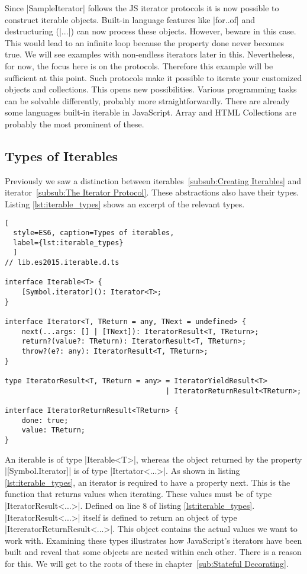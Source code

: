 Since |SampleIterator| follows the JS iterator protocols it is now possible to 
construct iterable objects. Built-in language features like |for..of| and 
destructuring (|...|) can now process these objects. However, beware in this 
case. This would lead to an infinite loop because the property done never 
becomes true. We will see examples with non-endless iterators later in this. 
Nevertheless, for now, the focus here is on the protocols. Therefore this 
example will be sufficient at this point.
\newline
Such protocols make it possible to iterate your customized objects and
collections. This opens new possibilities. Various programming tasks can be 
solvable differently, probably more straightforwardly.\newline
There are already some languages built-in iterable in JavaScript. Array and
HTML Collections are probably the most prominent of these.

\subsection{Types of Iterables}
\label{sub:Types of Iterables}
Previously we saw a distinction between 
iterables~\ref{subsub:Creating Iterables} and 
iterator~\ref{subsub:The Iterator Protocol}. These abstractions also have their 
types. Listing \ref{lst:iterable_types} shows an excerpt of the relevant types.

\begin{lstlisting}[
  style=ES6, caption=Types of iterables,
  label={lst:iterable_types}
  ]
// lib.es2015.iterable.d.ts

interface Iterable<T> {
    [Symbol.iterator](): Iterator<T>;
}

interface Iterator<T, TReturn = any, TNext = undefined> {
    next(...args: [] | [TNext]): IteratorResult<T, TReturn>;
    return?(value?: TReturn): IteratorResult<T, TReturn>;
    throw?(e?: any): IteratorResult<T, TReturn>;
}

type IteratorResult<T, TReturn = any> = IteratorYieldResult<T> 
                                      | IteratorReturnResult<TReturn>;

interface IteratorReturnResult<TReturn> {
    done: true;
    value: TReturn;
}
\end{lstlisting}

An iterable is of type |Iterable<T>|, whereas the object returned by the property
|[Symbol.Iterator]| is of type |Itertator<...>|. As shown in listing
\ref{lst:iterable_types}, an iterator is required to have a property next. 
This is the function that returns values when iterating. These values must be 
of type |IteratorResult<...>|. Defined on line 8 of listing 
\ref{lst:iterable_types}. |IteratorResult<...>| itself is defined to return an 
object of type |ItereratorReturnResult<...>|. This object contains the actual 
values we want to work with. Examining these types illustrates how JavaScript's 
iterators have been built and reveal that some objects are nested within each
other. There is a reason for this. We will get to the roots of these in
chapter~\ref{sub:Stateful Decorating}.

